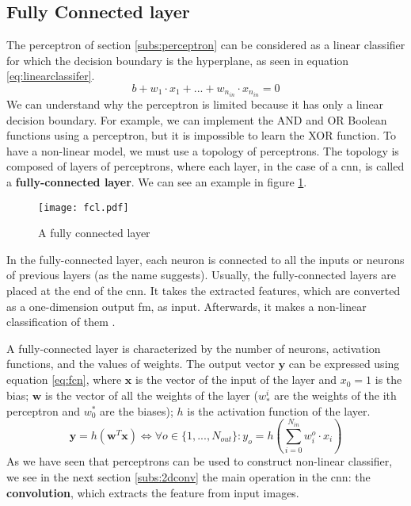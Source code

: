 \subsection{Fully Connected layer} \label{subs:fcl}
The perceptron of section \ref{subs:perceptron} can be considered as a linear classifier for which the decision boundary is the hyperplane, as seen in equation \eqref{eq:linearclassifer}.
%
\begin{equation}
    b + w_1 \cdot x_1 + ... + w_{n_{in}} \cdot x_{n_{in}} = 0
    \label{eq:linearclassifer}
\end{equation}
%
We can understand why the perceptron is limited because it has only a linear decision boundary. For example, we can implement the AND and OR Boolean functions using a perceptron, but it is impossible to learn the XOR function. To have a non-linear model, we must use a topology of perceptrons. The topology is composed of layers of perceptrons, where each layer, in the case of a \acrshort{cnn}, is called a \textbf{fully-connected layer}. We can see an example in figure \ref{fig:fcn}.
%
\begin{figure}
    \centering
    \texttt{[image: fcl.pdf]}
    \caption{A fully connected layer}
    \label{fig:fcn}
\end{figure}

In the fully-connected layer, each neuron is connected to all the inputs or neurons of previous layers (as the name suggests). Usually, the fully-connected layers are placed at the end of the \acrshort{cnn}. It takes the extracted features, which are converted as a one-dimension output \acrshort{fm}, as input. Afterwards, it makes a non-linear classification of them \cite{khan_survey_2020}.

A fully-connected layer is characterized by the number of neurons, activation functions, and the values of weights. The output vector $\boldsymbol{y}$ can be expressed using equation \eqref{eq:fcn}, where $\boldsymbol{x}$ is the vector of the input of the layer and $x_0 = 1$ is the bias;   $\boldsymbol{w}$ is the vector of all the weights of the layer ($w^i_*$ are the weights of the ith perceptron and $w^*_0$ are the biases); $h$ is the activation function of the layer.
%
\begin{equation}
    \boldsymbol{y} = h(\boldsymbol{w}^T \boldsymbol{x}) \Leftrightarrow \forall o \in \{ 1, ..., N_{out} \} : y_o = h(\sum^{N_{in}}_{i=0} w^o_i \cdot x_i)
    \label{eq:fcn}
\end{equation}
%
As we have seen that perceptrons can be used to construct non-linear classifier, we see in the next section \ref{subs:2dconv} the main operation in the \acrshort{cnn}: the \textbf{convolution}, which extracts the feature from input images.
